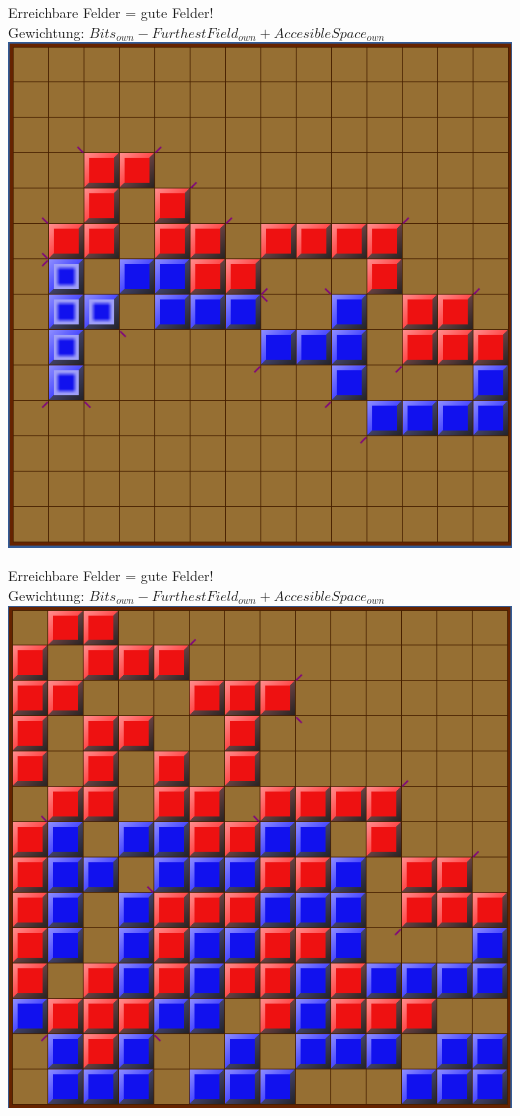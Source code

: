 \documentclass[12pt]{beamer}
\begin{document}
\begin{frame}
	Erreichbare Felder = gute Felder!\\
	Gewichtung: $Bits_{own} - FurthestField_{own} + AccesibleSpace_{own}$
	\pause
	\includegraphics[width=0.6\linewidth]{media/wgh19.png}
\end{frame}
\begin{frame}
	Erreichbare Felder = gute Felder!\\
	Gewichtung: $Bits_{own} - FurthestField_{own} + AccesibleSpace_{own}$
	\includegraphics[width=0.6\linewidth]{media/wgh20.png}
\end{frame}
\end{document}

